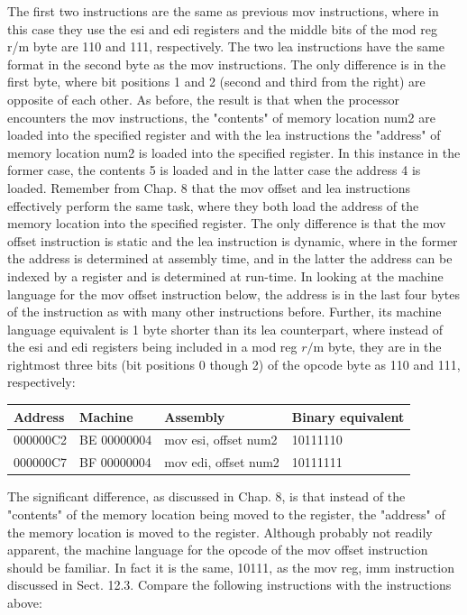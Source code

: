 \documentclass[10pt]{book}
\begin{document}
The first two instructions are the same as previous mov instructions, where in this case they use the esi and edi registers and the middle bits of the mod reg r/m byte are 110 and 111, respectively. The two lea instructions have the same format in the second byte as the mov instructions. The only difference is in the first byte, where bit positions 1 and 2 (second and third from the right) are opposite of each other. As before, the result is that when the processor encounters the mov instructions, the "contents" of memory location num2 are loaded into the specified register and with the lea instructions the "address" of memory location num2 is loaded into the specified register. In this instance in the former case, the contents 5 is loaded and in the latter case the address 4 is loaded.
Remember from Chap. 8 that the mov offset and lea instructions effectively perform the same task, where they both load the address of the memory location into the specified register. The only difference is that the mov offset instruction is static and the lea instruction is dynamic, where in the former the address is determined at assembly time, and in the latter the address can be indexed by a register and is determined at run-time. In looking at the machine language for the mov offset instruction below, the address is in the last four bytes of the instruction as with many other instructions before. Further, its machine language equivalent is 1 byte shorter than its lea counterpart, where instead of the esi and edi registers being included in a mod reg $r / \mathrm{m}$ byte, they are in the rightmost three bits (bit positions 0 though 2) of the opcode byte as 110 and 111, respectively:

\begin{center}
\begin{tabular}{|l|l|l|l|}
\hline
Address & Machine & Assembly & Binary equivalent \\
\hline
000000C2 & BE 00000004 & mov esi, offset num2 & 10111110 \\
\hline
000000C7 & BF 00000004 & mov edi, offset num2 & 10111111 \\
\hline
\end{tabular}
\end{center}

The significant difference, as discussed in Chap. 8, is that instead of the "contents" of the memory location being moved to the register, the "address" of the memory location is moved to the register. Although probably not readily apparent, the machine language for the opcode of the mov offset instruction should be familiar. In fact it is the same, 10111, as the mov reg, imm instruction discussed in Sect. 12.3. Compare the following instructions with the instructions above:
\end{document}
